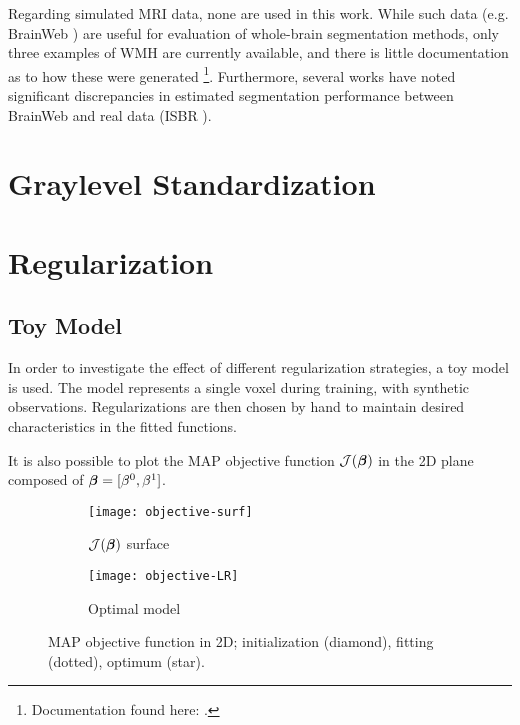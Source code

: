 Regarding simulated MRI data, none are used in this work.
While such data (e.g. BrainWeb \cite{Collins1998}) are useful for evaluation of whole-brain segmentation methods, only three examples of WMH are currently available, and there is little documentation as to how these were generated%
\footnote{Documentation found here: .}.
Furthermore, several works \cite{Klauschen2009,Eggert2012} have noted significant discrepancies in estimated segmentation performance between BrainWeb and real data (ISBR \cite{IBSR}).
\section{Graylevel Standardization}


\section{Regularization}


\subsection{Toy Model}\label{ss:toyreg}
In order to investigate the effect of different regularization strategies, a toy model is used.
The model represents a single voxel during training, with synthetic observations.
Regularizations are then chosen by hand to maintain desired characteristics in the fitted functions.
\par
It is also possible to plot the MAP objective function $\mathcal{J}(\bm{\beta})$ in the 2D plane composed of $\bm{\beta} = [\beta^0,\beta^1]$.
\begin{figure}
  \centering
  \begin{subfigure}{\plotwidth}\centering\texttt{[image: objective-surf]}\caption{$\mathcal{J}(\bm{\beta})$ surface}\label{fig:obj-surf}\end{subfigure}
  \begin{subfigure}{\plotwidth}\centering\texttt{[image: objective-LR]}  \caption{Optimal model}\label{fig:obj-lr}\end{subfigure}
  \caption{MAP objective function in 2D; initialization (diamond), fitting (dotted), optimum (star).}
\end{figure}


